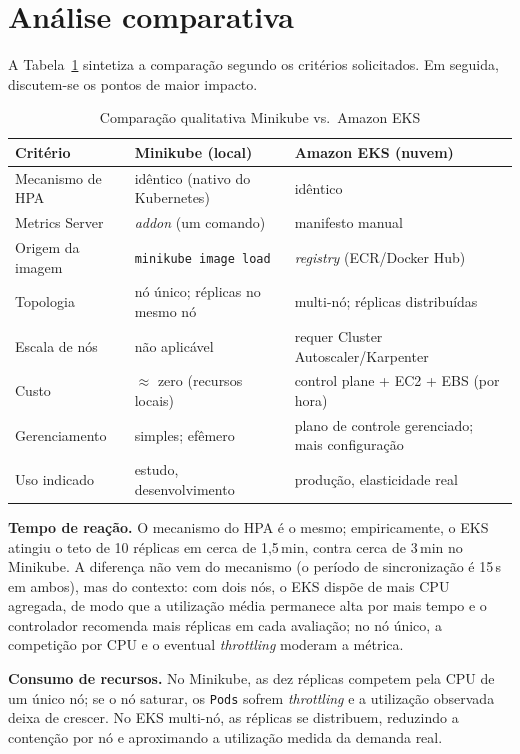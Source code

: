 \documentclass[conference]{IEEEtran}
\begin{document}
\section{Análise comparativa}\label{sec:comp}
A Tabela~\ref{tab:comp} sintetiza a comparação segundo os critérios solicitados. Em seguida,
discutem-se os pontos de maior impacto.

\begin{table}[!t]
\caption{Comparação qualitativa Minikube vs.\ Amazon EKS}
\label{tab:comp}
\centering
\footnotesize
\begin{tabular}{@{}p{2.0cm}p{2.6cm}p{2.6cm}@{}}
\toprule
\textbf{Critério} & \textbf{Minikube (local)} & \textbf{Amazon EKS (nuvem)} \\
\midrule
Mecanismo de HPA & idêntico (nativo do Kubernetes) & idêntico \\
Metrics Server & \textit{addon} (um comando) & manifesto manual \\
Origem da imagem & \texttt{minikube image load} & \textit{registry} (ECR/Docker Hub) \\
Topologia & nó único; réplicas no mesmo nó & multi-nó; réplicas distribuídas \\
Escala de nós & não aplicável & requer Cluster Autoscaler/Karpenter \\
Custo & $\approx$ zero (recursos locais) & control plane + EC2 + EBS (por hora) \\
Gerenciamento & simples; efêmero & plano de controle gerenciado; mais configuração \\
Uso indicado & estudo, desenvolvimento & produção, elasticidade real \\
\bottomrule
\end{tabular}
\end{table}

\textbf{Tempo de reação.} O mecanismo do HPA é o mesmo; empiricamente, o EKS atingiu o teto de 10
réplicas em cerca de 1,5\,min, contra cerca de 3\,min no Minikube. A diferença não vem do
mecanismo (o período de sincronização é 15\,s em ambos), mas do contexto: com dois nós, o EKS
dispõe de mais CPU agregada, de modo que a utilização média permanece alta por mais tempo e o
controlador recomenda mais réplicas em cada avaliação; no nó único, a competição por CPU e o
eventual \textit{throttling} moderam a métrica.

\textbf{Consumo de recursos.} No Minikube, as dez réplicas competem pela CPU de um único nó; se o
nó saturar, os \texttt{Pods} sofrem \textit{throttling} e a utilização observada deixa de crescer.
No EKS multi-nó, as réplicas se distribuem, reduzindo a contenção por nó e aproximando a
utilização medida da demanda real.
\end{document}
